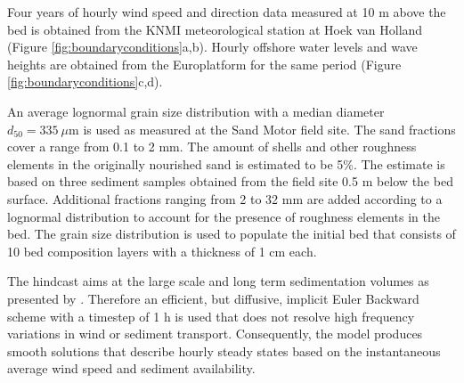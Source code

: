 Four years of hourly wind speed and direction data measured at 10 m
above the bed is obtained from the KNMI meteorological station at Hoek
van Holland (Figure \ref{fig:boundaryconditions}a,b). Hourly offshore
water levels and wave heights are obtained from the Europlatform for
the same period (Figure \ref{fig:boundaryconditions}c,d).

An average lognormal grain size distribution with a median diameter
$d_{50} = 335 ~ \mu \mathrm{m}$ is used as measured at the Sand Motor
field site. The sand fractions cover a range from 0.1 to 2 mm. The
amount of shells and other roughness elements in the originally
nourished sand is estimated to be 5\%. The estimate is based on three
sediment samples obtained from the field site 0.5 m below the bed
surface. Additional fractions ranging from 2 to 32 mm are added
according to a lognormal distribution to account for the presence of
roughness elements in the bed. The grain size distribution is used to
populate the initial bed that consists of 10 bed composition layers
with a thickness of 1 cm each.

The hindcast aims at the large scale and long term sedimentation
volumes as presented by \citet{Hoonhout2017a}. Therefore an efficient,
but diffusive, implicit Euler Backward scheme with a timestep of 1 h
is used that does not resolve high frequency variations in wind or
sediment transport. Consequently, the model produces smooth solutions
that describe hourly steady states based on the instantaneous average
wind speed and sediment availability.

